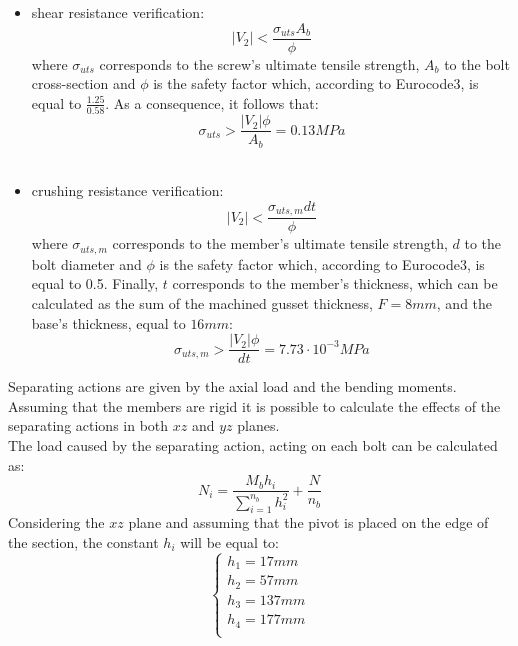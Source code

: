 \begin{itemize}
    \item shear resistance verification:
    \begin{equation*}
        |V_{2}| < \frac{\sigma_{uts}A_{b}}{\phi}
    \end{equation*}
    where $\sigma_{uts}$ corresponds to the screw's ultimate tensile strength, $A_{b}$ to the bolt cross-section and $\phi$ is the safety factor which, according to Eurocode3, is equal to $\frac{1.25}{0.58}$.
    As a consequence, it follows that:
    \begin{equation*}
       \sigma_{uts} > \frac{|V_{2}|\phi}{A_{b}} = 0.13 MPa
    \end{equation*}\\
    \item crushing resistance verification:
    \begin{equation*}
        |V_{2}| < \frac{\sigma_{uts,m}dt}{\phi}
    \end{equation*}
    where $\sigma_{uts,m}$ corresponds to the member's ultimate tensile strength, $d$ to the bolt diameter and $\phi$ is the safety factor which, according to Eurocode3, is equal to 0.5. Finally, $t$ corresponds to the member's thickness, which can be calculated as the sum of the machined gusset thickness, $F = 8 mm$, and the base's thickness, equal to $16 mm$:
     \begin{equation*}
       \sigma_{uts,m} > \frac{|V_{2}|\phi}{dt} = 7.73 \cdot 10^{-3} MPa
    \end{equation*}
\end{itemize}
Separating actions are given by the axial load and the bending moments.\\
Assuming that the members are rigid it is possible to calculate the effects of the separating actions in both $xz$ and $yz$ planes.\\
The load caused by the separating action, acting on each bolt can be calculated as:\\
\begin{equation*}
    N_{i} = \frac{M_{b}h_{i}}{\sum\limits_{i=1}^{n_{b}} h^2_{i}} + \frac{N}{n_{b}}
\end{equation*}
Considering the $xz$ plane and assuming that the pivot is placed on the edge of the section, the constant $     h_{i}$ will be equal to:
\begin{equation*}
   \begin{cases}
    h_{1} = 17 mm\\
    h_{2} = 57 mm\\
    h_{3} = 137 mm\\
    h_{4} = 177 mm\\
    \end{cases} 
\end{equation*}
